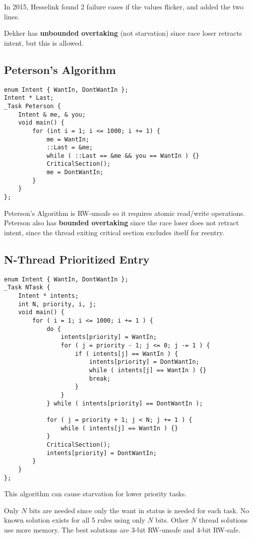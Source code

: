 \documentclass[11pt]{article}
\begin{document}
In 2015, Hesselink found 2 failure cases if the values flicker, and added the two lines.

Dekker has \textbf{unbounded overtaking} (not starvation) since race loser retracts intent, but this
is allowed.
\subsection{Peterson's Algorithm}
\label{sec:orge7afe33}
\begin{verbatim}
enum Intent { WantIn, DontWantIn };
Intent * Last;
_Task Peterson {
    Intent & me, & you;
    void main() {
        for (int i = 1; i <= 1000; i += 1) {
            me = WantIn;
            ::Last = &me;
            while ( ::Last == &me && you == WantIn ) {}
            CriticalSection();
            me = DontWantIn;
        }
    }
};
\end{verbatim}

Peterson's Algorithm is RW-unsafe so it requires atomic read/write operations.
Peterson also has \textbf{bounded overtaking} since the race loser does not retract intent,
since the thread exiting critical section excludes itself for reentry.
\subsection{N-Thread Prioritized Entry}
\label{sec:orgc4e62b2}
\begin{verbatim}
enum Intent { WantIn, DontWantIn };
_Task NTask {
    Intent * intents;
    int N, priority, i, j;
    void main() {
        for ( i = 1; i <= 1000; i += 1 ) {
            do {
                intents[priority] = WantIn;
                for ( j = priority - 1; j <= 0; j -= 1 ) {
                    if ( intents[j] == WantIn ) {
                        intents[priority] = DontWantIn;
                        while ( intents[j] == WantIn ) {}
                        break;
                    }
                }
            } while ( intents[priority] == DontWantIn );

            for ( j = priority + 1; j < N; j += 1 ) {
                while ( intents[j] == WantIn ) {}
            }
            CriticalSection();
            intents[priority] = DontWantIn;
        }
    }
};
\end{verbatim}

This algorithm can cause starvation for lower priority tasks.

Only \(N\) bits are needed since only the want in status is needed for
each task.
No known solution exists for all 5 rules using only \(N\) bits.
Other \(N\) thread solutions use more memory.
The best solutions are 3-bit RW-unsafe and 4-bit RW-safe.
\end{document}
